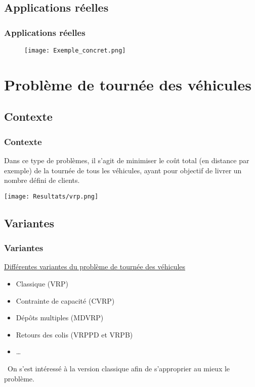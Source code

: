 \documentclass[10pt]{beamer}
\begin{document}
	\subsection{Applications réelles}

	\begin{frame}
		\frametitle{Applications réelles}
		\begin{figure}
			\texttt{[image: Exemple\_concret.png]}
		\end{figure}		
	\end{frame}
	
	\section{Problème de tournée des véhicules}

	\subsection{Contexte}
	
	\begin{frame}
		\frametitle{Contexte}
		Dans ce type de problèmes, il s'agit de minimiser le coût total (en distance par exemple) de la tournée de tous les véhicules, ayant pour objectif de livrer un nombre défini de clients.
		\begin{center}
			\texttt{[image: Resultats/vrp.png]}
		\end{center}
	\end{frame}

	\subsection{Variantes}
	
	\begin{frame}
		\frametitle{Variantes}
		\underline{Différentes variantes du problème de tournée des véhicules}
		\begin{itemize}[label=—]
			\item Classique (VRP)\pause
			\item Contrainte de capacité (CVRP)\pause
			\item Dépôts multiples (MDVRP)\pause
			\item Retours des colis (VRPPD et VRPB)\pause
			\item \dots 
		\end{itemize}
		\ \newline On s'est intéressé à la version classique afin de s'approprier au mieux le problème.
	\end{frame}
	
\end{document}
